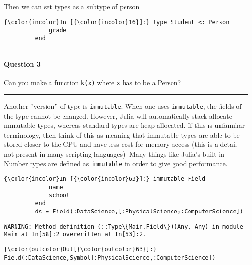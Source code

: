 \documentclass[11pt]{article}
\begin{document}
    Then we can set types as a subtype of person

    \begin{Verbatim}[commandchars=\\\{\}]
{\color{incolor}In [{\color{incolor}16}]:} type Student <: Person
             grade
         end
\end{Verbatim}

    \begin{center}\rule{3in}{0.4pt}\end{center}

\paragraph{Question 3}\label{question-3}

Can you make a function \texttt{k(x)} where \texttt{x} has to be a
Person?

\begin{center}\rule{3in}{0.4pt}\end{center}

Another ``version'' of type is \texttt{immutable}. When one uses
\texttt{immutable}, the fields of the type cannot be changed. However,
Julia will automatically stack allocate immutable types, whereas
standard types are heap allocated. If this is unfamiliar terminology,
then think of this as meaning that immutable types are able to be stored
closer to the CPU and have less cost for memory access (this is a detail
not present in many scripting languages). Many things like Julia's
built-in Number types are defined as \texttt{immutable} in order to give
good performance.

    \begin{Verbatim}[commandchars=\\\{\}]
{\color{incolor}In [{\color{incolor}63}]:} immutable Field
             name
             school
         end
         ds = Field(:DataScience,[:PhysicalScience;:ComputerScience])
\end{Verbatim}

    \begin{Verbatim}[commandchars=\\\{\}]
WARNING: Method definition (::Type\{Main.Field\})(Any, Any) in module Main at In[58]:2 overwritten at In[63]:2.

    \end{Verbatim}

            \begin{Verbatim}[commandchars=\\\{\}]
{\color{outcolor}Out[{\color{outcolor}63}]:} Field(:DataScience,Symbol[:PhysicalScience,:ComputerScience])
\end{Verbatim}
        
\end{document}
